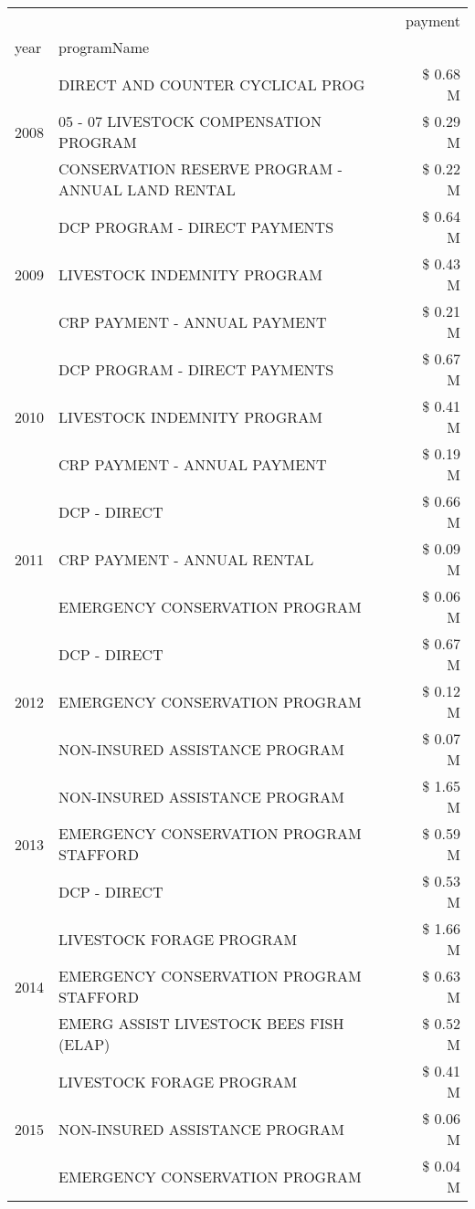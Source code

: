 \begin{tabular}{llr}
\toprule
 &  & payment \\
year & programName &  \\
\midrule
\multirow[t]{3}{*}{2008} & DIRECT AND COUNTER CYCLICAL PROG & \$ 0.68 M \\
 & 05 - 07 LIVESTOCK COMPENSATION PROGRAM & \$ 0.29 M \\
 & CONSERVATION RESERVE PROGRAM - ANNUAL LAND RENTAL & \$ 0.22 M \\
\cline{1-3}
\multirow[t]{3}{*}{2009} & DCP PROGRAM - DIRECT PAYMENTS & \$ 0.64 M \\
 & LIVESTOCK INDEMNITY PROGRAM & \$ 0.43 M \\
 & CRP PAYMENT - ANNUAL PAYMENT & \$ 0.21 M \\
\cline{1-3}
\multirow[t]{3}{*}{2010} & DCP PROGRAM - DIRECT PAYMENTS & \$ 0.67 M \\
 & LIVESTOCK INDEMNITY PROGRAM & \$ 0.41 M \\
 & CRP PAYMENT - ANNUAL PAYMENT & \$ 0.19 M \\
\cline{1-3}
\multirow[t]{3}{*}{2011} & DCP - DIRECT & \$ 0.66 M \\
 & CRP PAYMENT - ANNUAL RENTAL & \$ 0.09 M \\
 & EMERGENCY CONSERVATION PROGRAM & \$ 0.06 M \\
\cline{1-3}
\multirow[t]{3}{*}{2012} & DCP - DIRECT & \$ 0.67 M \\
 & EMERGENCY CONSERVATION PROGRAM & \$ 0.12 M \\
 & NON-INSURED ASSISTANCE PROGRAM & \$ 0.07 M \\
\cline{1-3}
\multirow[t]{3}{*}{2013} & NON-INSURED ASSISTANCE PROGRAM & \$ 1.65 M \\
 & EMERGENCY CONSERVATION PROGRAM STAFFORD & \$ 0.59 M \\
 & DCP - DIRECT & \$ 0.53 M \\
\cline{1-3}
\multirow[t]{3}{*}{2014} & LIVESTOCK FORAGE PROGRAM & \$ 1.66 M \\
 & EMERGENCY CONSERVATION PROGRAM STAFFORD & \$ 0.63 M \\
 & EMERG ASSIST LIVESTOCK BEES FISH (ELAP) & \$ 0.52 M \\
\cline{1-3}
\multirow[t]{3}{*}{2015} & LIVESTOCK FORAGE PROGRAM & \$ 0.41 M \\
 & NON-INSURED ASSISTANCE PROGRAM & \$ 0.06 M \\
 & EMERGENCY CONSERVATION PROGRAM & \$ 0.04 M \\
\cline{1-3}

\end{tabular}
